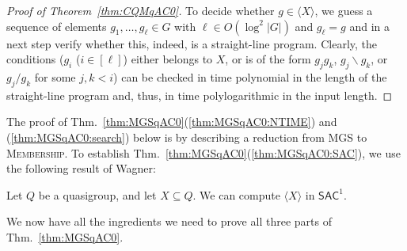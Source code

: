 \documentclass{theoretics}
\newcommand{\algprobm}[1]{\textsc{#1}\xspace}
\newcommand{\Thm}[1]{Thm.~\ref{#1}\xspace}
\newcommand*{\ComplexityClass}[1]{\ensuremath{\mathsf{#1}}\xspace}
\newcommand{\SAC}{\ComplexityClass{SAC}}
\begin{document}
\begin{proof}[Proof of Theorem~\ref{thm:CQMqAC0}]
    To decide whether $g \in \langle X \rangle$, we guess a sequence of elements $g_1, \dots, g_\ell \in G$ with $\ell \in O(\log^2 |G|)$ and $g_\ell = g$ and in a next step verify whether this, indeed, is a straight-line program. Clearly, the conditions ($g_{i}$ ($i \in [\ell]$) either belongs to $X$, or is of the form $g_{j}g_{k}$, $g_{j}\backslash g_{k}$, or $g_{j}/ g_{k}$ for some $j, k < i$) can be checked in time polynomial in the length of the straight-line program and, thus, in time polylogarithmic in the input length.
\end{proof}

The proof of \Thm{thm:MGSqAC0}(\ref{thm:MGSqAC0:NTIME}) and (\ref{thm:MGSqAC0:search}) below is by describing a reduction from \algprobm{MGS} to \algprobm{Membership}.
To establish \Thm{thm:MGSqAC0}(\ref{thm:MGSqAC0:SAC}), we use the following result of Wagner:

\begin{lemma} \label{lem:QuasigroupGeneration}
Let $Q$ be a quasigroup, and let $X \subseteq Q$. We can compute $\langle X \rangle$ in $\SAC^{1}$.
\end{lemma}

We now have all the ingredients we need to prove all three parts of \Thm{thm:MGSqAC0}.
\end{document}
